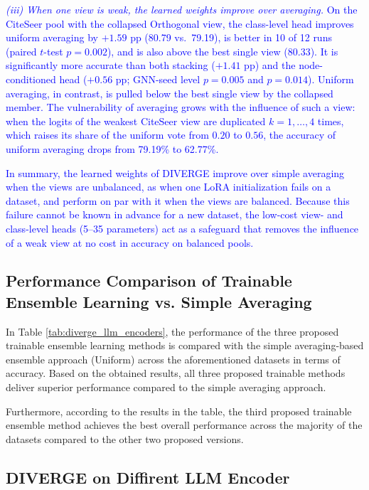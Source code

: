 \documentclass[a4paper,fleqn]{cas-sc}
\newcommand{\revtwo}[1]{\textcolor{blue}{#1}}  %
\begin{document}
\revtwo{\textit{(iii) When one view is weak, the learned weights improve over averaging.} On the CiteSeer pool with the collapsed Orthogonal view, the class-level head improves uniform averaging by $+1.59$ pp (80.79 vs.\ 79.19), is better in 10 of 12 runs (paired $t$-test $p=0.002$), and is also above the best single view (80.33). It is significantly more accurate than both stacking ($+1.41$ pp) and the node-conditioned head ($+0.56$ pp; GNN-seed level $p=0.005$ and $p=0.014$). Uniform averaging, in contrast, is pulled below the best single view by the collapsed member. The vulnerability of averaging grows with the influence of such a view: when the logits of the weakest CiteSeer view are duplicated $k=1,\dots,4$ times, which raises its share of the uniform vote from $0.20$ to $0.56$, the accuracy of uniform averaging drops from 79.19\% to 62.77\%.}

\revtwo{In summary, the learned weights of DIVERGE improve over simple averaging when the views are unbalanced, as when one LoRA initialization fails on a dataset, and perform on par with it when the views are balanced. Because this failure cannot be known in advance for a new dataset, the low-cost view- and class-level heads (5--35 parameters) act as a safeguard that removes the influence of a weak view at no cost in accuracy on balanced pools.}



\subsection{Performance Comparison of Trainable Ensemble Learning vs. Simple Averaging}\label{sec:trainable_vs_avg}

In Table \ref{tab:diverge_llm_encoders}, the performance of the three proposed trainable ensemble learning methods is compared with the simple averaging-based ensemble approach (Uniform) across the aforementioned datasets in terms of accuracy. Based on the obtained results, all three proposed trainable methods deliver superior performance compared to the simple averaging approach.

Furthermore, according to the results in the table, the third proposed trainable ensemble method achieves the best overall performance across the majority of the datasets compared to the other two proposed versions.

\subsection{DIVERGE on Diffirent LLM Encoder}\label{sec:llm_encoders}
\end{document}
